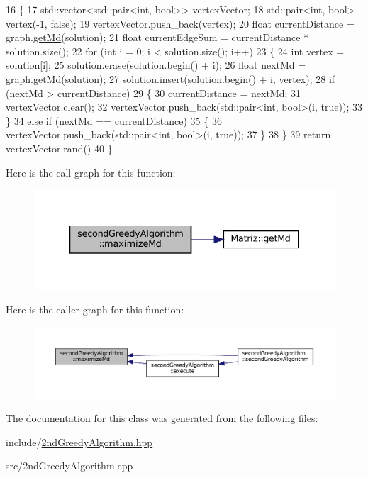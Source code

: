 \begin{DoxyCode}
16 \{
17   std::vector<std::pair<int, bool>> vertexVector;
18   std::pair<int, bool> vertex(-1, \textcolor{keyword}{false});
19   vertexVector.push\_back(vertex);
20   \textcolor{keywordtype}{float} currentDistance = graph.\hyperlink{classMatriz_a8df14a27d791f24206dd633b2a685c5b}{getMd}(solution);
21   \textcolor{keywordtype}{float} currentEdgeSum = currentDistance * solution.size();
22   \textcolor{keywordflow}{for} (\textcolor{keywordtype}{int} i = 0; i < solution.size(); i++)
23   \{
24     \textcolor{keywordtype}{int} vertex = solution[i];
25     solution.erase(solution.begin() + i);
26     \textcolor{keywordtype}{float} nextMd = graph.\hyperlink{classMatriz_a8df14a27d791f24206dd633b2a685c5b}{getMd}(solution);
27     solution.insert(solution.begin() + i, vertex);
28     \textcolor{keywordflow}{if} (nextMd > currentDistance)
29     \{
30       currentDistance = nextMd;
31       vertexVector.clear();
32       vertexVector.push\_back(std::pair<int, bool>(i, \textcolor{keyword}{true}));
33     \}
34     \textcolor{keywordflow}{else} \textcolor{keywordflow}{if} (nextMd == currentDistance)
35     \{
36       vertexVector.push\_back(std::pair<int, bool>(i, \textcolor{keyword}{true}));
37     \}
38   \}
39   \textcolor{keywordflow}{return} vertexVector[rand() %
40 \}
\end{DoxyCode}
Here is the call graph for this function\+:\nopagebreak
\begin{figure}[H]
\begin{center}
\leavevmode
\includegraphics[width=333pt]{classsecondGreedyAlgorithm_a1935f11c28b41515f6953f8108fbf482_cgraph}
\end{center}
\end{figure}
Here is the caller graph for this function\+:\nopagebreak
\begin{figure}[H]
\begin{center}
\leavevmode
\includegraphics[width=350pt]{classsecondGreedyAlgorithm_a1935f11c28b41515f6953f8108fbf482_icgraph}
\end{center}
\end{figure}


The documentation for this class was generated from the following files\+:\begin{DoxyCompactItemize}
\item 
include/\hyperlink{2ndGreedyAlgorithm_8hpp}{2nd\+Greedy\+Algorithm.\+hpp}\item 
src/2nd\+Greedy\+Algorithm.\+cpp\end{DoxyCompactItemize}
